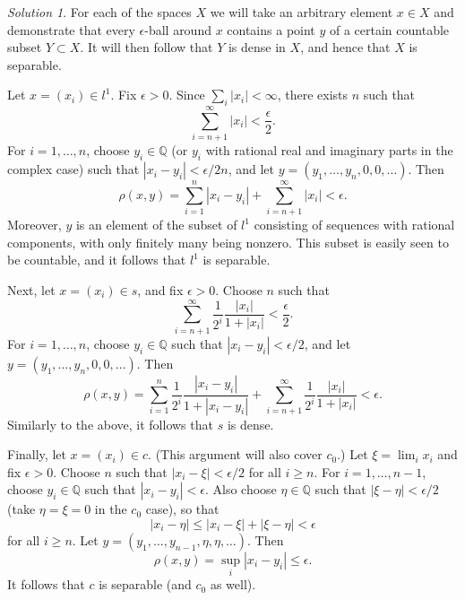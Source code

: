 \documentclass{report}
\newcommand{\bb}[1]{\mathbb{#1}}
\theoremstyle{remark}
\newtheorem*{solution}{Solution}
\begin{document}
\begin{solution}
  For each of the spaces $X$ we will take an arbitrary element $x \in X$ and demonstrate that every $\epsilon$-ball around $x$ contains a point $y$ of a certain countable subset $Y \subset X$. It will then follow that $Y$ is dense in $X$, and hence that $X$ is separable.

  Let $x = (x_i) \in l^1$. Fix $\epsilon > 0$. Since $\sum_i |x_i| < \infty$, there exists $n$ such that
  \begin{equation*}
    \sum_{i=n+1}^\infty |x_i| < \frac{\epsilon}{2}.
  \end{equation*}
  For $i = 1, \dots, n$, choose $y_i \in \bb Q$ (or $y_i$ with rational real and imaginary parts in the complex case) such that $|x_i - y_i| < \epsilon/2n$, and let $y = (y_1, \dots, y_n, 0, 0, \dots)$. Then
  \begin{equation*}
    \rho(x,y) = \sum_{i=1}^n |x_i - y_i| + \sum_{i=n+1}^\infty |x_i| < \epsilon.
  \end{equation*}
  Moreover, $y$ is an element of the subset of $l^1$ consisting of sequences with rational components, with only finitely many being nonzero. This subset is easily seen to be countable, and it follows that $l^1$ is separable.

  Next, let $x = (x_i) \in s$, and fix $\epsilon > 0$. Choose $n$ such that
  \begin{equation*}
    \sum_{i=n+1}^\infty \frac{1}{2^i} \frac{|x_i|}{1 + |x_i|} < \frac{\epsilon}{2}.
  \end{equation*}
  For $i = 1, \dots, n$, choose $y_i \in \bb Q$ such that $|x_i - y_i| < \epsilon/2$, and let $y = (y_1, \dots, y_n, 0, 0, \dots)$. Then
  \begin{equation*}
    \rho(x,y) = \sum_{i=1}^n \frac{1}{2^i} \frac{|x_i - y_i|}{1 + |x_i - y_i|} + \sum_{i=n+1}^\infty \frac{1}{2^i} \frac{|x_i|}{1 + |x_i|} < \epsilon.
  \end{equation*}
  Similarly to the above, it follows that $s$ is dense.

  Finally, let $x = (x_i) \in c$. (This argument will also cover $c_0$.) Let $\xi = \lim_i x_i$ and fix $\epsilon > 0$. Choose $n$ such that $|x_i - \xi| < \epsilon/2$ for all $i \ge n$. For $i = 1, \dots, n-1$, choose $y_i \in \bb Q$ such that $|x_i - y_i| < \epsilon$. Also choose $\eta \in \bb Q$ such that $|\xi - \eta| < \epsilon/2$ (take $\eta = \xi = 0$ in the $c_0$ case), so that
  \begin{equation*}
    |x_i - \eta| \le |x_i - \xi| + |\xi - \eta| < \epsilon
  \end{equation*}
  for all $i \ge n$. Let $y = (y_1, \dots, y_{n-1}, \eta, \eta, \dots)$. Then
  \begin{equation*}
    \rho(x,y) = \sup_i |x_i - y_i| \le \epsilon.
  \end{equation*}
  It follows that $c$ is separable (and $c_0$ as well).
\end{solution}
\end{document}
